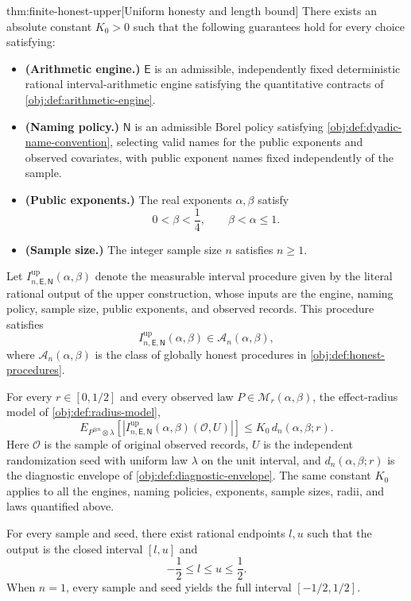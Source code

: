 \begin{theoremv}{thm:finite-honest-upper}[Uniform honesty and length bound]
There exists an absolute constant \(K_0>0\) such that the following guarantees hold for every choice satisfying:
\begin{itemize}
\item \textbf{(Arithmetic engine.)} \(\mathsf E\) is an admissible, independently fixed deterministic rational interval-arithmetic engine satisfying the quantitative contracts of \cref{obj:def:arithmetic-engine}.
\item \textbf{(Naming policy.)} \(\mathsf N\) is an admissible Borel policy satisfying \cref{obj:def:dyadic-name-convention}, selecting valid names for the public exponents and observed covariates, with public exponent names fixed independently of the sample.
\item \textbf{(Public exponents.)} The real exponents \(\alpha,\beta\) satisfy
\[
0<\beta<\frac14,\qquad \beta<\alpha\le1.
\]
\item \textbf{(Sample size.)} The integer sample size \(n\) satisfies \(n\ge1\).
\end{itemize}

Let \(I^{\mathrm{up}}_{n,\mathsf E,\mathsf N}(\alpha,\beta)\) denote the measurable interval procedure given by the literal rational output of the upper construction, whose inputs are the engine, naming policy, sample size, public exponents, and observed records. This procedure satisfies
\[
I^{\mathrm{up}}_{n,\mathsf E,\mathsf N}(\alpha,\beta)
\in\mathcal A_n(\alpha,\beta),
\]
where \(\mathcal A_n(\alpha,\beta)\) is the class of globally honest procedures in \cref{obj:def:honest-procedures}.

For every \(r\in[0,1/2]\) and every observed law \(P\in\mathcal M_r(\alpha,\beta)\), the effect-radius model of \cref{obj:def:radius-model},
\[
E_{P^{\otimes n}\otimes\lambda}
\left[
\left|I^{\mathrm{up}}_{n,\mathsf E,\mathsf N}(\alpha,\beta)(\mathcal O,U)\right|
\right]
\le K_0\,d_n(\alpha,\beta;r).
\]
Here \(\mathcal O\) is the sample of original observed records, \(U\) is the independent randomization seed with uniform law \(\lambda\) on the unit interval, and \(d_n(\alpha,\beta;r)\) is the diagnostic envelope of \cref{obj:def:diagnostic-envelope}. The same constant \(K_0\) applies to all the engines, naming policies, exponents, sample sizes, radii, and laws quantified above.

For every sample and seed, there exist rational endpoints \(l,u\) such that the output is the closed interval \([l,u]\) and
\[
-\frac12\le l\le u\le\frac12.
\]
When \(n=1\), every sample and seed yields the full interval \([-1/2,1/2]\).
\end{theoremv}

